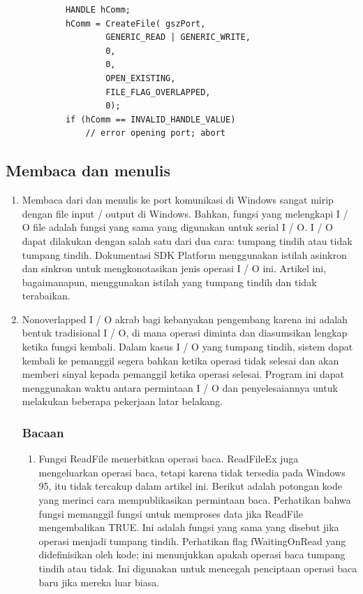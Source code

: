 		\begin{verbatim}
			HANDLE hComm;
			hComm = CreateFile( gszPort,  
                    GENERIC_READ | GENERIC_WRITE, 
                    0, 
                    0, 
                    OPEN_EXISTING,
                    FILE_FLAG_OVERLAPPED,
                    0);
			if (hComm == INVALID_HANDLE_VALUE)
				// error opening port; abort
		\end{verbatim}
	\subsection{Membaca dan menulis}
		\begin{enumerate}
			\item Membaca dari dan menulis ke port komunikasi di Windows sangat mirip dengan file input / output  di Windows. Bahkan, fungsi yang melengkapi I / O file adalah fungsi yang sama yang digunakan untuk serial I / O. I / O dapat dilakukan dengan salah satu dari dua cara: tumpang tindih atau tidak tumpang tindih. Dokumentasi SDK Platform menggunakan istilah asinkron dan sinkron untuk mengkonotasikan jenis operasi I / O ini. Artikel ini, bagaimanapun, menggunakan istilah yang tumpang tindih dan tidak terabaikan.
			\item Nonoverlapped I / O akrab bagi kebanyakan pengembang karena ini adalah bentuk tradisional I / O, di mana operasi diminta dan diasumsikan lengkap ketika fungsi kembali. Dalam kasus I / O yang tumpang tindih, sistem dapat kembali ke pemanggil segera bahkan ketika operasi tidak selesai dan akan memberi sinyal kepada pemanggil ketika operasi selesai. Program ini dapat menggunakan waktu antara permintaan I / O dan penyelesaiannya untuk melakukan beberapa pekerjaan latar belakang.
				\subsubsection{Bacaan}
					\begin{enumerate}
						\item Fungsi ReadFile menerbitkan operasi baca. ReadFileEx juga mengeluarkan operasi baca, tetapi karena tidak tersedia pada Windows 95, itu tidak tercakup dalam artikel ini. Berikut adalah potongan kode yang merinci cara mempublikasikan permintaan baca. Perhatikan bahwa fungsi memanggil fungsi untuk memproses data jika ReadFile mengembalikan TRUE. Ini adalah fungsi yang sama yang disebut jika operasi menjadi tumpang tindih. Perhatikan flag fWaitingOnRead yang didefinisikan oleh kode; ini menunjukkan apakah operasi baca tumpang tindih atau tidak. Ini digunakan untuk mencegah penciptaan operasi baca baru jika mereka luar biasa.
				

\end{enumerate}
\end{enumerate}
